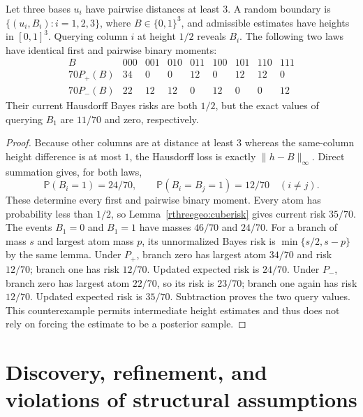 \begin{counterexample}
\label{rthreegeo:parity}
Let three bases $u_i$ have pairwise distances at least $3$.
A random boundary is $\{(u_i,B_i):i=1,2,3\}$, where
$B\in\{0,1\}^3$, and admissible estimates have heights in $[0,1]^3$.
Querying column $i$ at height $1/2$ reveals $B_i$.
The following two laws have identical first and pairwise binary moments:
\[
\begin{array}{c|rrrrrrrr}
 B&000&001&010&011&100&101&110&111\\\hline
 70P_+(B)&34&0&0&12&0&12&12&0\\
 70P_-(B)&22&12&12&0&12&0&0&12
\end{array}
\]
Their current Hausdorff Bayes risks are both $1/2$, but the exact values
of querying $B_1$ are $11/70$ and zero, respectively.
\end{counterexample}
\begin{proof}
Because other columns are at distance at least $3$ whereas the
same-column height difference is at most $1$, the Hausdorff loss is
exactly $\|h-B\|_\infty$.
Direct summation gives, for both laws,
\[
 \mathbb P(B_i=1)=24/70,\qquad
 \mathbb P(B_i=B_j=1)=12/70\quad(i\ne j).
\]
These determine every first and pairwise binary moment.
Every atom has probability less than $1/2$, so
Lemma~\ref{rthreegeo:cuberisk} gives current risk $35/70$.
The events $B_1=0$ and $B_1=1$ have masses $46/70$ and $24/70$.
For a branch of mass $s$ and largest atom mass $p$, its unnormalized
Bayes risk is $\min\{s/2,s-p\}$ by the same lemma.
Under $P_+$, branch zero has largest atom $34/70$ and risk $12/70$;
branch one has risk $12/70$. Updated expected risk is $24/70$.
Under $P_-$, branch zero has largest atom $22/70$, so its risk is
$23/70$; branch one again has risk $12/70$. Updated expected risk
is $35/70$. Subtraction proves the two query values.
This counterexample permits intermediate height estimates and thus
does not rely on forcing the estimate to be a posterior sample.
\end{proof}

\section{Discovery, refinement, and violations of structural assumptions}

